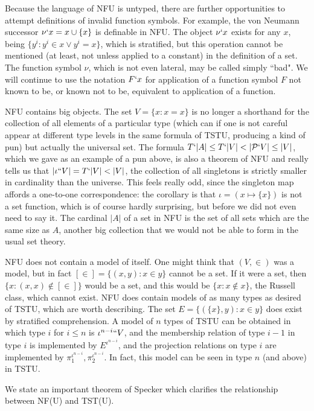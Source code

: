 \documentclass[12pt]{article}
\begin{document}
Because the language of NFU is untyped, there are further opportunities to attempt definitions of invalid function symbols.  For example, the von Neumann successor $\nu`x = x \cup \{x\}$ is definable in NFU.  The object
$\nu`x$ exists for any $x$, being $\{y^i:y^i \in x \vee y^i = x\}$, which is stratified, but this operation cannot be mentioned (at least, not unless applied to a constant) in the definition of a set.  The function symbol
$\nu$, which is not even lateral, may be called simply ``bad".  We will continue to use the notation $F`x$ for application of a function symbol $F$ not known to be, or known not to be, equivalent to application of a function.

NFU contains big objects.  The set $V = \{x:x=x\}$ is no longer a shorthand for the collection of all elements of a particular type (which can if one is not careful appear at different type levels in the same
formula of TSTU, producing a kind of pun) but actually the universal set.  The formula $T`|A| \leq T`|V| < |{\cal P}`V| \leq |V|$, which we gave as an example of a pun above, is also a theorem of NFU and
really tells us that $|\iota``V| = T`|V|<|V|$, the collection of all singletons is strictly smaller in cardinality than the universe.  This feels really odd, since the singleton map affords a one-to-one correspondence:
the corollary is that $\iota = (x \mapsto \{x\})$ is not a set function, which is of course hardly surprising, but before we did not even need to say it.  The cardinal $|A|$ of a set in NFU is the set of all sets which are the same size as $A$, another big collection that we would not be able to form in the usual set theory.

NFU does not contain a model of itself.  One might think that $(V ,\in)$ was a model, but in fact $[\in] =\{(x,y):x \in y\}$ cannot be a set.    If it were a set, then $\{x:(x,x) \not\in [\in]\}$ would be a set, and this would be $\{x:x \not\in x\}$, the Russell class, which cannot exist.   NFU does contain models of as many types as desired of TSTU, which are worth describing.  The set $E = \{(\{x\},y):x \in y\}$ does exist by stratified comprehension.  A model of $n$ types of TSTU can be obtained in which type $i$ for $i \leq n$ is $\iota^{n-i}``V$, and the membership relation of type $i-1$ in type $i$ is implemented by $E^{\iota^{n-i}}$, and the projection relations on type $i$ are implemented by $\pi_1^{\iota^{n-i}}, \pi_2^{\iota^{n-i}}$.  In fact, this model can be seen in type $n$ (and above) in TSTU.

We state an important theorem of Specker which clarifies the relationship between NF(U) and TST(U).
\end{document}
